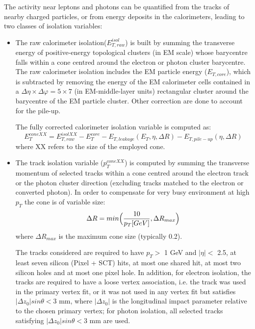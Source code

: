 \documentclass[a4paper, oneside]{book}
\begin{document}
		\cite{El ph reco}The activity near leptons and photons can be quantified from the tracks of nearby charged particles, or from energy deposits in the calorimeters, leading to two classes of isolation variables:
		\begin{itemize}
			\item The raw calorimeter isolation($E_{T,raw}^{isol}$) is built by summing the transverse energy of positive-energy topological clusters (in EM scale) whose barycentre falls within a cone centred around the electron or photon cluster barycentre. The raw calorimeter isolation includes the EM particle energy ($E_{T,core}$), which is subtracted by removing the energy of the EM calorimeter cells contained in a $\Delta\eta \times \Delta\varphi = 5 \times 7$ (in EM-middle-layer units) rectangular
			cluster around the barycentre of the EM particle cluster. Other correction are done to account for the pile-up. %
			
			The fully corrected calorimeter isolation variable is computed as:
			$$ 
			E_{T}^{coneXX} = E_{T,raw}^{isolXX} - E_{T}^{core} - E_{T,leakage}(E_T,\eta,\Delta R) -E_{T,pile-up}(\eta,\Delta R)
			$$
			where XX refers to the size of the employed cone.
			\item The track isolation variable ($p_T^{coneXX}$) is computed by summing the transverse momentum of selected tracks within a cone centred around the electron track or the photon cluster direction (excluding tracks matched to the electron or converted photon). \cite{El ph isol}In order to compensate for very busy environment at high $p_T$ the cone is of variable size:
			$$
			\Delta R = min\Bigl({\frac{10}{p_T[GeV]},\Delta R_{max}}\Bigr)
			$$
			where $\Delta R_{max}$ is the maximum cone size (typically 0.2).
			
			The tracks considered are required to have $p_T >$ 1 GeV and $|\eta| <$ 2.5, at least seven silicon (Pixel + SCT) hits, at most one shared hit, at most two silicon holes and at most one pixel hole. In addition, for electron isolation, the tracks are required to have a loose vertex association, i.e. the track was used in the primary vertex fit, or it was not used in any vertex fit but satisfies $|\Delta z_0|sin{\theta} < 3$ mm, where $|\Delta z_0|$ is the longitudinal impact parameter relative to the chosen primary vertex; for photon
			isolation, all selected tracks satisfying $|\Delta z_0|sin{\theta} < 3$ mm are used.
		\end{itemize}
		
		
		
\end{document}
